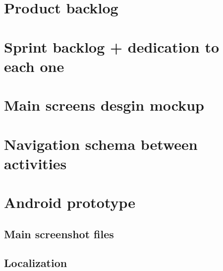 \documentclass[11pt,a4paper]{article}
\begin{document}
\newpage

\section{Product backlog}

\newpage

\section{Sprint backlog + dedication to each one}

\newpage

\section{Main screens desgin mockup}

\newpage

\section{Navigation schema between activities}

\newpage

\section{Android prototype}
\subsection{Main screenshot files}

\newpage

\subsection{Localization}

\newpage
\end{document}
